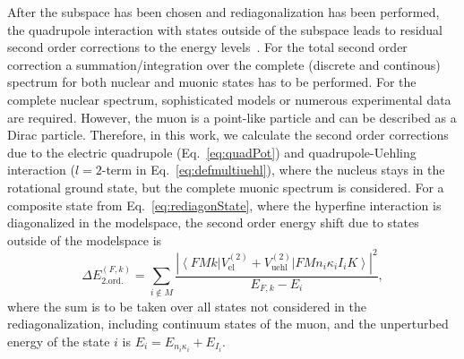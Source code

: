 After the subspace has been chosen and rediagonalization has been performed, the quadrupole interaction with states outside of the subspace leads to residual second order corrections to the energy levels~\cite{chen1970}. 
For the total second order correction a summation/integration over the complete (discrete and continous) spectrum for both nuclear and muonic states has to be performed. For the complete nuclear spectrum, sophisticated models or numerous experimental data are required. However, the muon is a point-like particle and can be described as a Dirac particle. Therefore, in this work, we calculate the second order corrections due to the electric quadrupole (Eq.~\eqref{eq:quadPot}) and quadrupole-Uehling interaction (${l}{=}{2}$-term in Eq.~\eqref{eq:defmultiuehl}), where the nucleus stays in the rotational ground state, but the complete muonic spectrum is considered.
For a composite state from Eq.~\eqref{eq:rediagonState}, where the hyperfine interaction is diagonalized in the modelspace, the second order energy shift due to states outside of the modelspace is
\begin{equation}
\Delta E_{\text{2.ord.}}^{(F,k)}= \sum_{i\notin M}\frac{\left|\left< FMk\right|{V_{\text{el}}^{(2)}}{+}{V_{\text{uehl}}^{(2)}}\left|FMn_i\kappa_iI_iK \right>\right|^2}{E_{F,k}-E_i},
\label{eq:second}
\end{equation}
where the sum is to be taken over all states not considered in the rediagonalization, including continuum states of the muon, and the unperturbed energy of the state $i$ is $E_i=E_{n_i\kappa_i}+E_{I_i}$.














